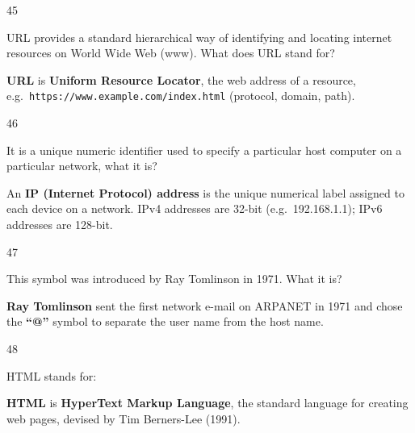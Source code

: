\begin{question}{45}
{URL provides a standard hierarchical way of identifying and locating internet resources on World Wide Web (www). What does URL stand for?\par}
\begin{explain}
\textbf{URL} is \textbf{Uniform Resource Locator}, the web address of a resource, e.g.\ \texttt{https://www.example.com/index.html} (protocol, domain, path).
\end{explain}
\end{question}

\begin{question}{46}
{It is a unique numeric identifier used to specify a particular host computer on a particular network, what it is?\par}
\begin{explain}
An \textbf{IP (Internet Protocol) address} is the unique numerical label assigned to each device on a network. IPv4 addresses are 32-bit (e.g.\ 192.168.1.1); IPv6 addresses are 128-bit.
\end{explain}
\end{question}

\begin{question}{47}
{This symbol was introduced by Ray Tomlinson in 1971. What it is?\par}
\begin{explain}
\textbf{Ray Tomlinson} sent the first network e-mail on ARPANET in 1971 and chose the \textbf{``@''} symbol to separate the user name from the host name.
\end{explain}
\end{question}

\begin{question}{48}
{HTML stands for:\par}
\begin{explain}
\textbf{HTML} is \textbf{HyperText Markup Language}, the standard language for creating web pages, devised by Tim Berners-Lee (1991).
\end{explain}
\end{question}

